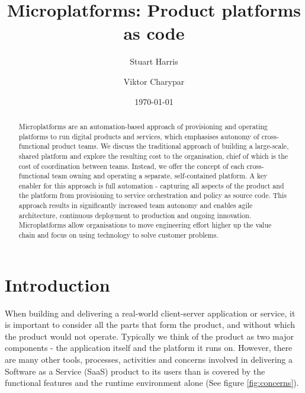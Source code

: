 \documentclass[reprint,amsmath,amssymb,aps]{revtex4-1}
\begin{document}

\title{Microplatforms: Product platforms as code}%

\author{Stuart Harris}
\author{Viktor Charypar}%

\date{\today}

\begin{abstract}
Microplatforms are an automation-based approach of provisioning and operating platforms to run digital products and services, which emphasises autonomy of cross-functional product teams. We discuss the traditional approach of building a large-scale, shared platform and explore the resulting cost to the organisation, chief of which is the cost of coordination between teams. Instead, we offer the concept of each cross-functional team owning and operating a separate, self-contained platform. A key enabler for this approach is full automation - capturing all aspects of the product and the platform from provisioning to service orchestration and policy as source code. This approach results in significantly increased team autonomy and enables agile architecture, continuous deployment to production and ongoing innovation. Microplatforms allow organisations to move engineering effort higher up the value chain and focus on using technology to solve customer problems.
\end{abstract}

\maketitle


\section*{Introduction}
\label{sec:introduction}

When building and delivering a real-world client-server application or service, it is important to consider all the parts that form the product, and without which the product would not operate. Typically we think of the product as two major components - the application itself and the platform it runs on. However, there are many other tools, processes, activities and concerns involved in delivering a Software as a Service (SaaS) product to its users than is covered by the functional features and the runtime environment alone (See figure \ref{fig:concerns}).
\end{document}

